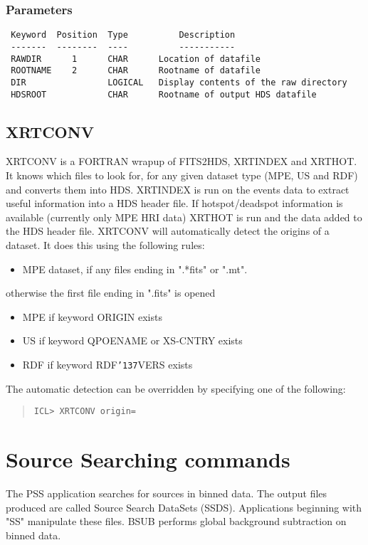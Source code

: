 \documentclass{book}
\renewcommand{\_}{{\tt\char'137}}     %
\begin{document}
\subsection{Parameters}
\begin{verbatim}
 Keyword  Position  Type          Description
 -------  --------  ----          -----------
 RAWDIR      1      CHAR      Location of datafile
 ROOTNAME    2      CHAR      Rootname of datafile
 DIR                LOGICAL   Display contents of the raw directory
 HDSROOT            CHAR      Rootname of output HDS datafile

\end{verbatim}\section{XRTCONV}
XRTCONV is a FORTRAN wrapup of FITS2HDS, XRTINDEX and XRTHOT. It
knows which files to look for, for any given dataset type (MPE, US and RDF)
and converts them into HDS. XRTINDEX is run on the events data to
extract useful information into a HDS header file. If hotspot/deadspot
information is available (currently only MPE HRI data) XRTHOT is run
and the data added to the HDS header file.
XRTCONV will automatically detect the origins of a dataset. It does this
using the following rules:
\begin{itemize}
\item MPE dataset, if any files ending in ".*fits" or ".mt".
\end{itemize}
otherwise the first file ending in ".fits" is opened
\begin{itemize}
\item MPE if keyword ORIGIN exists
\item US if keyword QPOENAME or XS-CNTRY exists
\item RDF if keyword RDF\_VERS exists
\end{itemize}
The automatic detection can be overridden by specifying one of the
following:
\begin{quote}\begin{verbatim}
ICL> XRTCONV origin=
\end{verbatim}\end{quote}
\chapter{Source Searching commands}
The PSS application searches for sources in binned data. The
output files produced are called Source Search DataSets (SSDS).
Applications beginning with "SS" manipulate these files.
BSUB performs global background subtraction on binned data.
\end{document}
